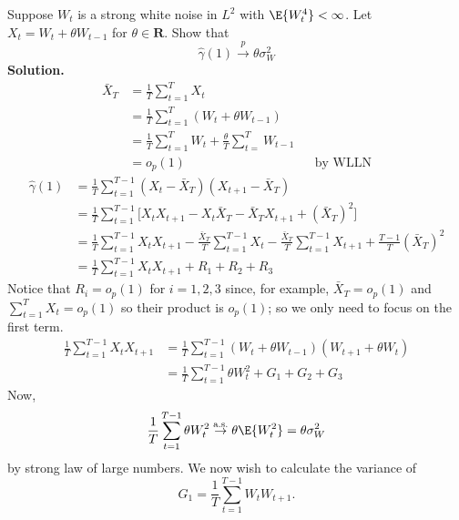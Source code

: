 \begin{Example}{}{}
    Suppose $ W_t $ is a strong white noise
    in $ L^2 $ with $ \E{W_t^4}<\infty $. Let $ X_t=W_t+\theta W_{t-1} $
    for $ \theta\in\mathbf{R} $. Show that
    \[ \hat{\gamma}(1)\stackrel{p}{\to}\theta\sigma_W^2 \]
    \textbf{Solution.}
    \begin{align*}
        \bar{X}_T
         & =\frac{1}{T} \sum_{t=1}^{T} X_t                                                            \\
         & =\frac{1}{T} \sum_{t=1}^{T} (W_t+\theta W_{t-1})                                           \\
         & =\frac{1}{T} \sum_{t=1}^{T} W_t+\frac{\theta}{T} \sum_{t=}^{T} W_{t-1}                     \\
         & =o_p(1)                                                                &  & \text{by WLLN}
    \end{align*}
    \begin{align*}
        \hat{\gamma}(1)
         & =\frac{1}{T} \sum_{t=1}^{T-1} (X_t-\bar{X}_T)(X_{t+1}-\bar{X}_T)                                                                                           \\
         & =\frac{1}{T} \sum_{t=1}^{T-1} \bigl[X_t X_{t+1}-X_t\bar{X}_T-\bar{X}_T X_{t+1}+(\bar{X}_T)^2\bigr]                                                         \\
         & =\frac{1}{T} \sum_{t=1}^{T-1} X_t X_{t+1}-\frac{\bar{X}_T}{T}\sum_{t=1}^{T-1} X_t-\frac{\bar{X}_T}{T} \sum_{t=1}^{T-1} X_{t+1}+\frac{T-1}{T} (\bar{X}_T)^2 \\
         & =\frac{1}{T} \sum_{t=1}^{T-1} X_{t} X_{t+1}+R_{1}+ R_{2}+R_{3}
    \end{align*}
    Notice that $ R_{i}=o_p(1) $ for $ i=1,2,3 $ since, for example,
    $ \bar{X}_T=o_p(1) $ and $ \sum_{t=1}^{T} X_t=o_p(1) $ so their product is
    $ o_p(1) $; so we only need to focus on the first term.
    \begin{align*}
        \frac{1}{T} \sum_{t=1}^{T-1} X_t X_{t+1}
         & =\frac{1}{T} \sum_{t=1}^{T-1} (W_t+\theta W_{t-1})(W_{t+1}+\theta W_{t}) \\
         & =\frac{1}{T} \sum_{t=1}^{T-1}\theta W_{t}^2+G_{1}+G_{2}+G_{3}
    \end{align*}
    Now,
    \[ \frac{1}{T} \sum_{t=1}^{T-1} \theta W_{t}^2\stackrel{\text{a.s.}}{\to} \theta \E{W_t^2}=\theta\sigma_W^2 \]
    by strong law of large numbers. We now wish to calculate the variance of
    \[ G_{1}=\frac{1}{T} \sum_{t=1}^{T-1} W_{t} W_{t+1}. \]

\end{Example}
